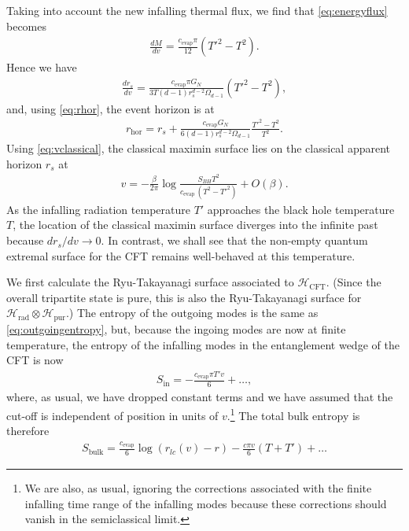 \documentclass[11pt,a4paper]{article}
\begin{document}
Taking into account the new infalling thermal flux, we find that \eqref{eq:energyflux} becomes
\begin{align}
\frac{d M}{d v} =\frac{c_\text{evap} \pi}{12} (T'^2 - T^2).
\end{align}
Hence we have
\begin{align} \label{eq:drsT'}
\frac{d r_s}{d v} = \frac{c_\text{evap} \pi G_N}{3 T(d-1) r_s^{d-2} \Omega_{d-1}}(T'^2 - T^2),
\end{align}
and, using \eqref{eq:rhor}, the event horizon is at
\begin{align}
r_\text{hor} = r_s + \frac{c_\text{evap} G_N}{6 (d-1) r_s^{d-2} \Omega_{d-1}}\frac{T'^2 - T^2}{T^2}.
\end{align}
Using \eqref{eq:vclassical}, the classical maximin surface lies on the classical apparent horizon $r_s$ at
\begin{align}
v =  -\frac{\beta}{2 \pi} \log \frac{S_{BH}T^2}{c_\text{evap} \,(T^2 - T'^2)} + O(\beta).
\end{align}
As the infalling radiation temperature $T'$ approaches the black hole temperature $T$, the location of the classical maximin surface diverges into the infinite past because $d r_s/d v \to 0$. In contrast, we shall see that the non-empty quantum extremal surface for the CFT remains well-behaved at this temperature.

We first calculate the Ryu-Takayanagi surface associated to $\mathcal{H}_\text{CFT}$. (Since the overall tripartite state is pure, this is also the Ryu-Takayanagi surface for $\mathcal{H}_\text{rad} \otimes \mathcal{H}_\text{pur}$.) The entropy of the outgoing modes is the same as \eqref{eq:outgoingentropy}, but, because the ingoing modes are now at finite temperature, the entropy of the infalling modes in the entanglement wedge of the CFT is now
\begin{align} \label{eq:dSindv}
S_\text{in} = - \frac{c_\text{evap} \pi  T' v}{6} + \dots,
\end{align}
where, as usual, we have dropped constant terms and we have assumed that the cut-off is independent of position in units of $v$.\footnote{We are also, as usual, ignoring the corrections associated with the finite infalling time range of the infalling modes because these corrections should vanish in the semiclassical limit.} The total bulk entropy is therefore
\begin{align} \label{eq:outgoingentropyT'}
S_\text{bulk} = \frac{c_\text{evap}}{6}\log\left(r_{lc}(v) - r\right) - \frac{c\pi v}{6}(T+T') + \dots
\end{align}
\end{document}
